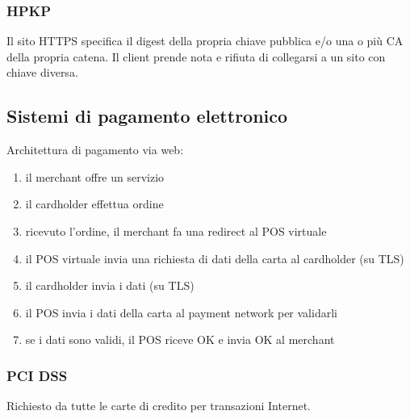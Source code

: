 \documentclass[11pt]{article}
\begin{document}
\subsubsection{HPKP}
Il sito HTTPS specifica il digest della propria chiave pubblica e/o una o più CA della propria catena. Il client prende 
nota e rifiuta di collegarsi a un sito con chiave diversa.
\subsection{Sistemi di pagamento elettronico}
Architettura di pagamento via web:
\begin{enumerate}
    \item il merchant offre un servizio
    \item il cardholder effettua ordine 
    \item ricevuto l'ordine, il merchant fa una redirect al POS virtuale 
    \item il POS virtuale invia una richiesta di dati della carta al cardholder (su TLS)
    \item il cardholder invia i dati (su TLS)
    \item il POS invia i dati della carta al payment network per validarli 
    \item se i dati sono validi, il POS riceve OK e invia OK al merchant 
\end{enumerate}
\subsubsection{PCI DSS}
Richiesto da tutte le carte di credito per transazioni Internet. 
\end{document}
